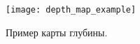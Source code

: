 \begin{figure}[!h]
	\begin{minipage}[b]{1.0\linewidth}
		\centering
		\centerline{ \texttt{[image: depth\_map\_example]} }
	\end{minipage}
    \caption{Пример карты глубины.}
	\label{fig:depth_map_example}
\end{figure}
